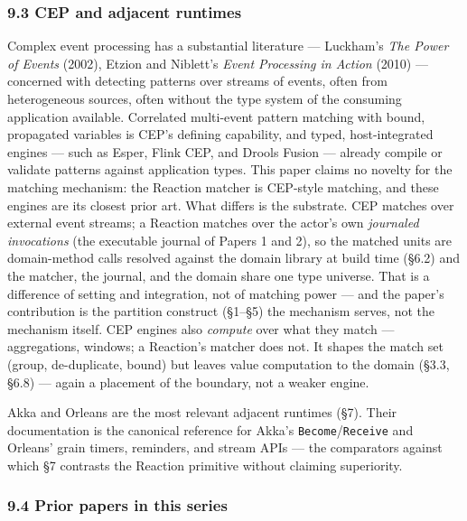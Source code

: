 \documentclass[
]{article}
\let\origtexttt\texttt%
\renewcommand{\texttt}[1]{\origtexttt{\seqsplit{#1}}}%
\let\texttt\origtexttt%
\begin{document}
\subsubsection{9.3 CEP and adjacent
runtimes}\label{cep-and-adjacent-runtimes}

Complex event processing has a substantial literature --- Luckham's
\emph{The Power of Events} (2002), Etzion and Niblett's \emph{Event
Processing in Action} (2010) --- concerned with detecting patterns over
streams of events, often from heterogeneous sources, often without the
type system of the consuming application available. Correlated
multi-event pattern matching with bound, propagated variables is CEP's
defining capability, and typed, host-integrated engines --- such as
Esper, Flink CEP, and Drools Fusion --- already compile or validate
patterns against application types. This paper claims no novelty for the
matching mechanism: the Reaction matcher is CEP-style matching, and
these engines are its closest prior art. What differs is the substrate.
CEP matches over external event streams; a Reaction matches over the
actor's own \emph{journaled invocations} (the executable journal of
Papers 1 and 2), so the matched units are domain-method calls resolved
against the domain library at build time (§6.2) and the matcher, the
journal, and the domain share one type universe. That is a difference of
setting and integration, not of matching power --- and the paper's
contribution is the partition construct (§1--§5) the mechanism serves,
not the mechanism itself. CEP engines also \emph{compute} over what they
match --- aggregations, windows; a Reaction's matcher does not. It
shapes the match set (group, de-duplicate, bound) but leaves value
computation to the domain (§3.3, §6.8) --- again a placement of the
boundary, not a weaker engine.

Akka and Orleans are the most relevant adjacent runtimes (§7). Their
documentation is the canonical reference for Akka's
\texttt{Become}/\texttt{Receive} and Orleans' grain timers, reminders,
and stream APIs --- the comparators against which §7 contrasts the
Reaction primitive without claiming superiority.

\subsubsection{9.4 Prior papers in this
series}\label{prior-papers-in-this-series}
\end{document}
